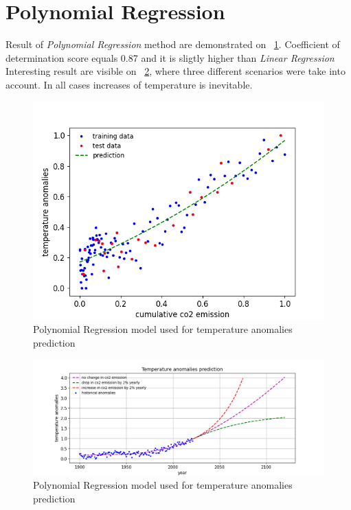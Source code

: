 \newpage
\section{Polynomial Regression}
Result of \textit{Polynomial Regression} method are demonstrated on ~\ref{fig:polynomial-regression}. Coefficient of determination score equals 0.87 and it is sligtly higher than \textit{Linear Regression}
Interesting result are visible on ~\ref{fig:polynomial-regression-result}, where three different scenarios were take into account. In all cases increases of temperature is inevitable. 
\begin{figure}[h]
  \includegraphics[width=\linewidth]{img/polynomial-regression.png}
  \caption{Polynomial Regression model used for temperature anomalies prediction}
  \label{fig:polynomial-regression}
\end{figure}
\begin{figure}[h]
  \includegraphics[width=\linewidth]{img/polynomial-regression-result.png}
  \caption{Polynomial Regression model used for temperature anomalies prediction}
  \label{fig:polynomial-regression-result}
\end{figure}
